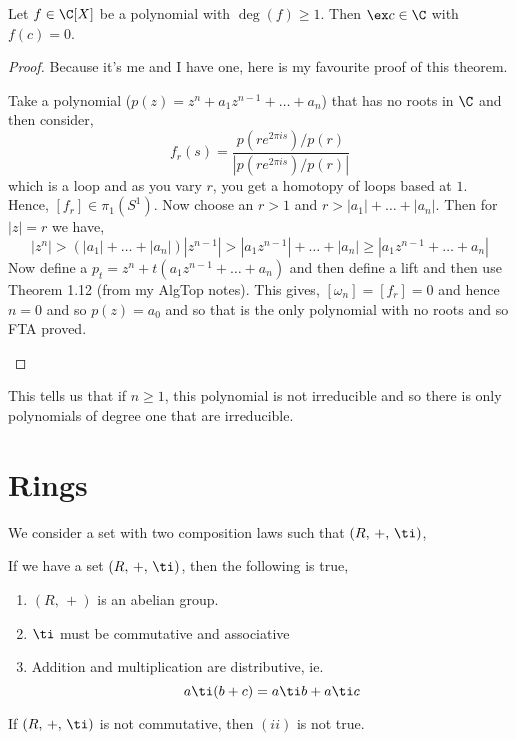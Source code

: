 \begin{nthm}
  Let $f \in \C[X]$ be a polynomial with $\deg(f) \ge 1$. Then $\ex c \in \C$ with $f(c) = 0$.
\end{nthm}
\begin{proof}
  Because it's me and I have one, here is my favourite proof of this theorem.
  \begin{tcolorbox}
    Take a polynomial ($p(z) = z^n + a_1z^{n-1} + \dots + a_n$) that has no roots in $\C$ and then consider,
    $$ f_r(s) = \frac{p(re^{2\pi is})/p(r)}{|p(re^{2\pi is})/p(r)|} $$
    which is a loop and as you vary $r$, you get a homotopy of loops based at $1$. Hence, $[f_r] \in \pi_1({S^1})$. Now choose an $r > 1$ and $r > |a_1| + \dots + |a_n|$. Then for $|z| = r$ we have,
    $$ |z^n| > (|a_1| + \dots + |a_n|)|z^{n-1}| > |a_1z^{n-1}| + \dots + |a_n| \ge |a_1z^{n-1} + \dots + a_n| $$
    Now define a $p_t = z^n + t(a_1z^{n-1} + \dots + a_n)$ and then define a lift and then use Theorem 1.12 (from my AlgTop notes). This gives, $[\omega_n] = [f_r] = 0$ and hence $n = 0$ and so $p(z) = a_0$ and so that is the only polynomial with no roots and so FTA proved.
  \end{tcolorbox}
\end{proof}

This tells us that if $n \ge 1$, this polynomial is not irreducible and so there is only polynomials of degree one that are irreducible.

\section{Rings}
We consider a set with two composition laws such that $(R,\,+,\,\ti)$,
\begin{ndefi}
  If we have a set $(R,\,+,\,\ti)$, then the following is true,
  \begin{enumerate}
    \item $(R,\,+)$ is an abelian group.
    \item $\ti$ must be commutative and associative
    \item Addition and multiplication are distributive, ie.
    $$ a \ti (b + c) = a \ti b + a \ti c $$
  \end{enumerate}
\end{ndefi}

\begin{remark}
   If $(R,\,+,\,\ti)$ is not commutative, then $(ii)$ is not true.
\end{remark}

